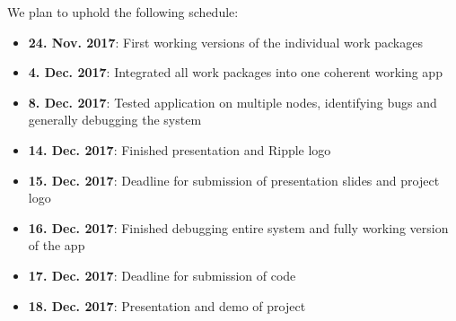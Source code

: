 \documentclass{report}
\begin{document}
We plan to uphold the following schedule:
\begin{itemize}
\item  \textbf{24. Nov. 2017}: First working versions of the individual work packages
\item  \textbf{4. Dec. 2017}: Integrated all work packages into one coherent working app
\item \textbf{8. Dec. 2017}: Tested application on multiple nodes, identifying bugs and generally debugging the system
\item \textbf{14. Dec. 2017}: Finished presentation and Ripple logo
\item \textbf{15. Dec. 2017}: Deadline for submission of presentation slides and project logo
\item \textbf{16. Dec. 2017}: Finished debugging entire system and fully working version of the app
\item \textbf{17. Dec. 2017}: Deadline for submission of code
\item \textbf{18. Dec. 2017}: Presentation and demo of project
\end{itemize}




\end{document}
